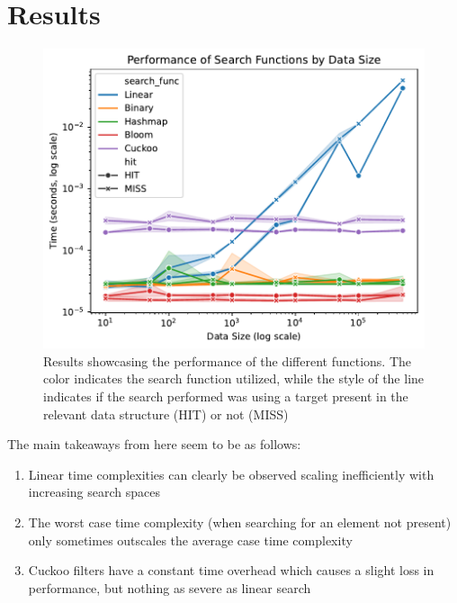 \documentclass[acmsmall,screen, nonacm]{acmart}
\begin{document}
\section{Results}

\begin{figure}[H]
	\centering
	\includegraphics[width=1\textwidth]{results.pdf}
	\caption{Results showcasing the performance of the different functions. The color indicates the search function utilized, while the style of the line indicates if the search performed was using a target present in the relevant data structure (HIT) or not (MISS)}
	\label{fig:pdfimage}
\end{figure}

The main takeaways from here seem to be as follows:
\begin{enumerate}
	\item Linear time complexities can clearly be observed scaling inefficiently with increasing search spaces
	\item The worst case time complexity (when searching for an element not present) only sometimes outscales the average case time complexity
	\item Cuckoo filters have a constant time overhead which causes a slight loss in performance, but nothing as severe as linear search
\end{enumerate}
\end{document}
